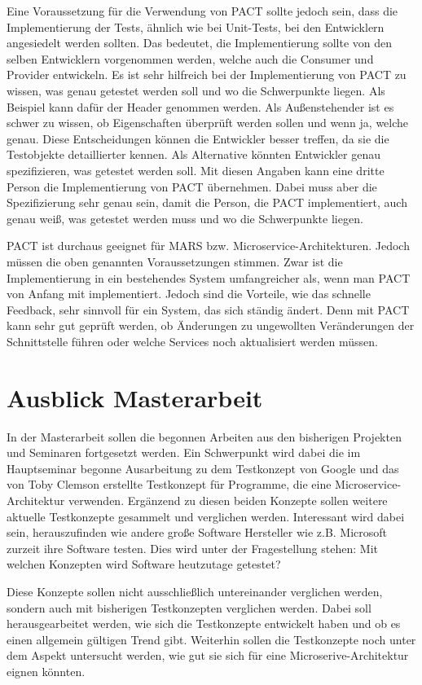 \documentclass{llncs}
\begin{document}
Eine Voraussetzung für die Verwendung von PACT sollte jedoch sein, dass die Implementierung der Tests, ähnlich wie bei Unit-Tests, bei den Entwicklern angesiedelt werden sollten. Das bedeutet, die Implementierung sollte von den selben Entwicklern vorgenommen werden, welche auch die Consumer und Provider entwickeln. Es ist sehr hilfreich bei der Implementierung von PACT zu wissen, was genau getestet werden soll und wo die Schwerpunkte liegen. Als Beispiel kann dafür der Header genommen werden. Als Außenstehender ist es schwer zu wissen, ob Eigenschaften überprüft werden sollen und wenn ja, welche genau. Diese Entscheidungen können die Entwickler besser treffen, da sie die Testobjekte detaillierter kennen. Als Alternative könnten Entwickler genau spezifizieren, was getestet werden soll. Mit diesen Angaben kann eine dritte Person die Implementierung von PACT übernehmen. Dabei muss aber die Spezifizierung sehr genau sein, damit die Person, die PACT implementiert, auch genau weiß, was getestet werden muss und wo die Schwerpunkte liegen. 

PACT ist durchaus geeignet für MARS bzw. Microservice-Architekturen. Jedoch müssen die oben genannten Voraussetzungen stimmen. Zwar ist die Implementierung in ein bestehendes System umfangreicher als, wenn man PACT von Anfang mit implementiert. Jedoch sind die Vorteile, wie das schnelle Feedback, sehr sinnvoll für ein System, das sich ständig ändert. Denn mit PACT kann sehr gut geprüft werden, ob Änderungen zu ungewollten Veränderungen der Schnittstelle führen oder welche Services noch aktualisiert werden müssen.

\section{Ausblick Masterarbeit}
In der Masterarbeit sollen die begonnen Arbeiten aus den bisherigen Projekten und Seminaren fortgesetzt werden. Ein Schwerpunkt wird dabei die im Hauptseminar begonne Ausarbeitung zu dem Testkonzept von Google und das von Toby Clemson erstellte Testkonzept für Programme, die eine Microservice-Architektur verwenden. Ergänzend zu diesen beiden Konzepte sollen weitere aktuelle Testkonzepte gesammelt und verglichen werden. Interessant wird dabei sein, herauszufinden wie andere große Software Hersteller wie z.B. Microsoft zurzeit ihre Software testen. Dies wird unter der Fragestellung stehen: Mit welchen Konzepten wird Software heutzutage getestet?

Diese Konzepte sollen nicht ausschließlich untereinander verglichen werden, sondern auch mit bisherigen Testkonzepten verglichen werden. Dabei soll herausgearbeitet werden, wie sich die Testkonzepte entwickelt haben und ob es einen allgemein gültigen Trend gibt. Weiterhin sollen die Testkonzepte noch unter dem Aspekt untersucht werden, wie gut sie sich für eine Microserive-Architektur eignen könnten.
\end{document}
